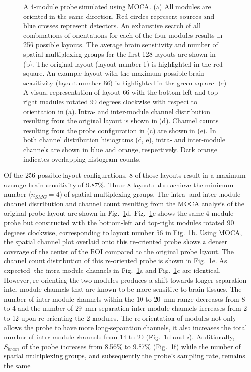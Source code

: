 \begin{figure}
\begin{center}
\end{center}
\caption{A 4-module probe simulated using MOCA. (a) All modules are oriented in the same direction. Red circles represent sources and blue crosses represent detectors. An exhaustive search of all combinations of orientations for each of the four modules results in 256 possible layouts. The average brain sensitivity and number of spatial multiplexing groups for the first 128 layouts are shown in (b). The original layout (layout number 1) is highlighted in the red square. An example layout with the maximum possible brain sensitivity (layout number 66) is highlighted in the green square. (c) A visual representation of layout 66 with the bottom-left and top-right modules rotated 90 degrees clockwise with respect to orientation in (a). Intra- and inter-module channel distribution resulting from the original layout is shown in (d). Channel counts resulting from the probe configuration in (c) are shown in (e). In both channel distribution histograms (d, e), intra- and inter-module channels are shown in blue and orange, respectively. Dark orange indicates overlapping histogram counts.} 
\label{fig:orientation}
\end{figure} 

Of the 256 possible layout configurations, 8 of those layouts result in a maximum average brain sensitivity of 9.87\%. These 8 layouts also achieve the minimum number ($n_{SMG}=4$) of spatial multiplexing groups. The intra- and inter-module channel distribution and channel count resulting from the MOCA analysis of the original probe layout are shown in Fig.~\ref{fig:orientation}d. Fig.~\ref{fig:orientation}c shows the same 4-module probe but constructed with the bottom-left and top-right modules rotated 90 degrees clockwise, corresponding to layout number 66 in Fig.~\ref{fig:orientation}b. Using MOCA, the spatial channel plot overlaid onto this re-oriented probe shows a denser coverage of the center of the ROI compared to the original probe layout. The channel count distribution of this re-oriented probe is shown in Fig.~\ref{fig:orientation}e. As expected, the intra-module channels in Fig.~\ref{fig:orientation}a and Fig.~\ref{fig:orientation}c are identical. However, re-orienting the two modules produces a shift towards longer separation inter-module channels that are known to be more sensitive to brain tissues. The number of inter-module channels within the 10 to 20~mm range decreases from 8 to 4 and the number of 29~mm separation inter-module channels increases from 2 to 12 upon re-orienting the 2 modules. The re-orientation of modules not only allows the probe to have more long-separation channels, it also increases the total number of inter-module channels from 14 to 20 (Fig.~\ref{fig:orientation}d and e). Additionally, $\overline{S_{brain}}$ of the probe increases from 8.56\% to 9.87\% (Fig.~\ref{fig:orientation}f) while the number of spatial multiplexing groups, and subsequently the probe's sampling rate, remains the same.


